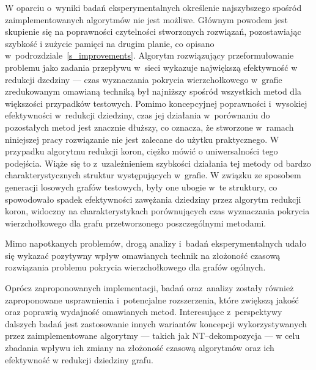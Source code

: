   W oparciu o~wyniki badań eksperymentalnych określenie najszybszego spośród zaimplementowanych algorytmów nie jest możliwe.
  Głównym powodem jest skupienie się na poprawności czytelności stworzonych rozwiązań, pozostawiając szybkość i zużycie pamięci na drugim planie, co opisano w~podrozdziale~\ref{s_improvements}.
  Algorytm rozwiązujący przeformułowanie problemu jako zadania przepływu w~sieci wykazuje największą efektywność w redukcji dzedziny --- czas wyznaczania pokrycia wierzchołkowego w~grafie zredukowanym omawianą techniką był najniższy spośród wszystkich metod dla większości przypadków testowych.
  Pomimo koncepcyjnej poprawności i~wysokiej efektywności w~redukcji dziedziny, czas jej działania w~porównaniu do pozostałych metod jest znacznie dłuższy, co oznacza, że stworzone w~ramach niniejszej pracy rozwiązanie nie jest zalecane do użytku praktycznego.
  W przypadku algorytmu redukcji koron, ciężko mówić o uniwersalności tego podejścia.
  Wiąże się to z~uzależnieniem szybkości działania tej metody od bardzo charakterystycznych struktur występujących w~grafie.
  W związku ze sposobem generacji losowych grafów testowych, były one ubogie w~te struktury, co spowodowało spadek efektywności zawężania dziedziny przez algorytm redukcji koron, widoczny na charakterystykach porównujących czas wyznaczania pokrycia wierzchołkowego dla grafu przetworzonego poszczególnymi metodami.

  Mimo napotkanych problemów, drogą analizy i~badań eksperymentalnych udało się wykazać pozytywny wpływ omawianych technik na złożoność czasową rozwiązania problemu pokrycia wierzchołkowego dla grafów ogólnych.

  Oprócz zaproponowanych implementacji, badań oraz~analizy zostały również zaproponowane usprawnienia i~potencjalne rozszerzenia, które zwiększą jakość oraz poprawią wydajność omawianych metod.
  Interesujące z~perspektywy dalszych badań jest zastosowanie innych wariantów koncepcji wykorzystywanych przez zaimplementowane algorytmy --- takich jak NT--dekompozycja --- w celu zbadania wpływu ich zmiany na złożoność czasową algorytmów oraz ich efektywność w redukcji dziedziny grafu.